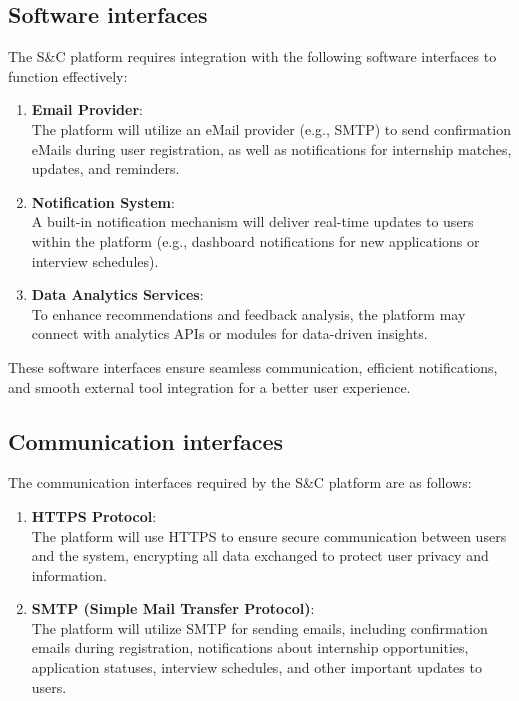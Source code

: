 \subsection{Software interfaces}
\label{subsec:software_interfaces}%


The S\&C platform requires integration with the following software
interfaces to function effectively:

\begin{enumerate}
\def\labelenumi{\arabic{enumi}.}
\item
  \textbf{Email Provider}:\\
  The platform will utilize an eMail provider (e.g., SMTP) to send
  confirmation eMails during user registration, as well as notifications
  for internship matches, updates, and reminders.
\item
  \textbf{Notification System}:\\
  A built-in notification mechanism will deliver real-time updates to
  users within the platform (e.g., dashboard notifications for new
  applications or interview schedules).
\item
  \textbf{Data Analytics Services}:\\
  To enhance recommendations and feedback analysis, the platform may
  connect with analytics APIs or modules for data-driven insights.
\end{enumerate}

These software interfaces ensure seamless communication, efficient
notifications, and smooth external tool integration for a better user
experience.


\subsection{Communication interfaces}
\label{subsec:communication_interfaces}%


The communication interfaces required by the S\&C platform are as
follows:

\begin{enumerate}
\def\labelenumi{\arabic{enumi}.}
\item
  \textbf{HTTPS Protocol}:\\
  The platform will use HTTPS to ensure secure communication between
  users and the system, encrypting all data exchanged to protect user
  privacy and information.
\item
  \textbf{SMTP (Simple Mail Transfer Protocol)}:\\
  The platform will utilize SMTP for sending emails, including
  confirmation emails during registration, notifications about
  internship opportunities, application statuses, interview schedules,
  and other important updates to users.
\end{enumerate}

